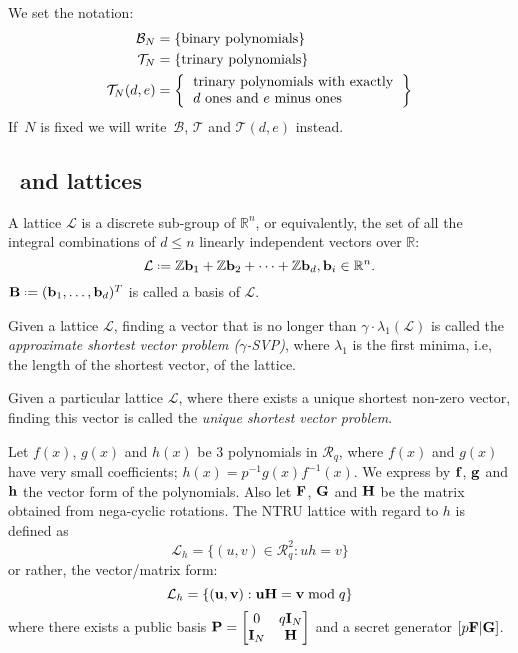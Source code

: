 \documentclass{llncs}
\newcommand{\Lcal}{{\mathcal L}}
\newcommand{\Rcal}{{\mathcal R}}
\newcommand{\Tcal}{{\mathcal T}}
\newcommand{\RR}{\mathbb{R}}
\newcommand{\ZZ}{\mathbb{Z}}
\newcommand{\bfb}{{\bf b}}
\newcommand{\bff}{{\bf f}}
\newcommand{\bfg}{{\bf g}}
\newcommand{\bfh}{{\bf h}}
\newcommand{\bfu}{{\bf u}}
\newcommand{\bfv}{{\bf v}}
\newcommand{\bfF}{{\bf F}}
\newcommand{\bfB}{{\bf B}}
\newcommand{\bfG}{{\bf G}}
\newcommand{\bfH}{{\bf H}}
\newcommand{\bfI}{{\bf I}}
\newcommand{\ntru}{{\sf{NTRU}}}
\newcommand{\<}{\langle}
\renewcommand{\>}{\rangle}
\newcommand*{\defeq}{\mathrel{\vcenter{\baselineskip0.5ex \lineskiplimit0pt
                     \hbox{\scriptsize.}\hbox{\scriptsize.}}}%
                     =}
\begin{document}
We set the notation:
\begin{align*}
\mathcal{B}_N&=\left\{\text{binary polynomials}\right\}\\
  \Tcal_N&=\left\{\text{trinary polynomials}\right\}\\
  \Tcal_N(d,e)&=\left\{
        \begin{tabular}{l}
        trinary polynomials with exactly\\ 
        $d$ ones and $e$ minus ones\\
        \end{tabular}
      \right\}
\end{align*}
If~$N$ is fixed we will write~$\mathcal{B}$, $\Tcal$ and $\Tcal(d,e)$ instead.

\subsection{\ntru~and lattices}
A lattice $\Lcal$ is a discrete sub-group of $\RR^n$, or equivalently,
the set of all the integral combinations of $d \leq n$ linearly independent vectors over $\RR$:
$$\Lcal \defeq \ZZ \bfb_1+ \ZZ \bfb_2 + \dots + \ZZ \bfb_d , \bfb_i \in \RR^n.$$
$\bfB \defeq ( \bfb_1 ,\dots ,\bfb_d )^T$ is called a basis of $\Lcal$.

\begin{definition}
Given a lattice $\Lcal$, finding a vector that is no longer than $\gamma\cdot \lambda_1(\Lcal)$ is called the {\em approximate shortest vector problem ($\gamma$-SVP)}, 
where $\lambda_1$ is the first minima, i.e, the length of the shortest vector, of the lattice.

 Given a particular lattice $\Lcal$, where
there exists a unique shortest non-zero vector, finding this vector is called the 
{\em unique shortest vector problem}.
\end{definition}


Let $f(x)$, $g(x)$ and $h(x)$ be $3$ polynomials in $\Rcal_q$,
where $f(x)$ and $g(x)$ have very small coefficients; $h(x) = p^{-1}g(x)f^{-1}(x)$.  We express by
$\bff$, $\bfg$  and  $\bfh$ the vector form of the polynomials. Also let $\bfF$, $\bfG$ and  $\bfH$ be the matrix  obtained from 
nega-cyclic rotations.
The NTRU lattice with regard to $h$ is defined as 
\[
\Lcal_h = \{(u,v) \in \Rcal_q^2: uh = v\}
\]
or rather, the vector/matrix form:
\[
\Lcal_h = \{(\bfu,\bfv): \bfu\bfH = \bfv \bmod q\}
\]
where there exists a public basis
$\bf P  = \begin{bmatrix}
0& q\bfI_N \\
\bfI_N& \bfH 
\end{bmatrix}
$
and a secret generator
$
[p\bfF|\bfG]
$. %
\end{document}
